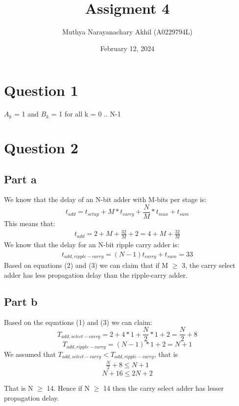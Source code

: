 \documentclass{article}
\title{Assigment 4}
\author{Muthya Narayanachary Akhil (A0229794L)}
\date{February 12, 2024}
\begin{document}
\maketitle
\section*{Question 1}
$A_{k}$ = 1 and $B_{k}$ = 1 for all k = 0 .. N-1
\section*{Question 2}
\subsection*{Part a}
We know that the delay of an N-bit adder with M-bits per stage is:
\begin{equation}
    t_{add} = t_{setup} + M*t_{carry} + \frac{N}{M} * t_{mux} + t_{sum}
\end{equation}
This means that:
\begin{eqnarray}
    t_{add} = 2 + M + \frac{32}{M} + 2 = 4 + M + \frac{32}{M}
\end{eqnarray}
We know that the delay for an N-bit ripple carry adder is:
\begin{eqnarray}
    t_{add,ripple-carry} = (N-1)t_{carry} + t_{sum} = 33
\end{eqnarray}
Based on equations (2) and (3) we can claim that if M $\geq$ 3, the carry select adder has less propagation delay than the ripple-carry adder.

\subsection*{Part b}
Based on the equations (1) and (3) we can claim:
\begin{equation}
    T_{add,select-carry} = 2 + 4*1 + \frac{N}{2} * 1 + 2 = \frac{N}{2} + 8
\end{equation}
\begin{equation}
    T_{add, ripple-carry} = (N-1) * 1 + 2 = N + 1
\end{equation}
We assumed that $T_{add,select-carry} < T_{add, ripple-carry}$, that is
\begin{eqnarray}
    \frac{N}{2}  + 8 \leq N + 1
\end{eqnarray}
\begin{equation}
    N + 16 \leq 2N + 2
\end{equation}

That is N $\geq$ 14. Hence if N $\geq$ 14 then the carry select adder has lesser propagation delay.
\end{document}
